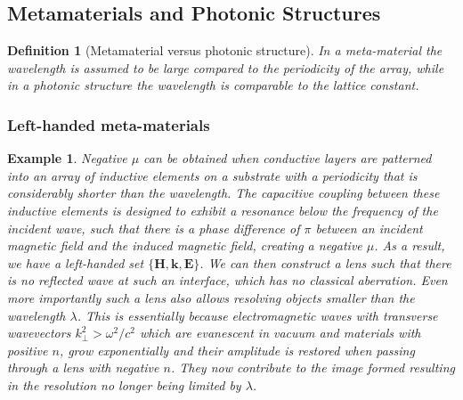 \documentclass[a4paper]{article}
\newtheorem{eg}{Example}[section]
\theoremstyle{new}
\newtheorem{defi}{Definition}[section]
\begin{document}
\subsection{Metamaterials and Photonic Structures}
\begin{defi}[Metamaterial versus photonic structure]
In a meta-material the wavelength is assumed to be large compared to the periodicity of the array, while in a photonic structure the wavelength is comparable to the lattice constant.
\end{defi}
\subsubsection*{Left-handed meta-materials}
\begin{eg}
Negative $\mu$ can be obtained when conductive layers are patterned into an array of inductive elements on a substrate with a periodicity that is considerably shorter than the wavelength. The capacitive coupling between these inductive elements is designed to exhibit a resonance below the frequency of the incident wave, such that there is a phase difference of $\pi$ between an incident magnetic field and the induced magnetic field, creating a negative $\mu$. As a result, we have a left-handed set $\{\mathbf{H},\mathbf{k},\mathbf{E}\}$. We can then construct a lens such that there is no reflected wave at such an interface, which has no classical aberration. Even more importantly such a lens also allows resolving objects smaller than the wavelength $\lambda$. This is essentially because electromagnetic waves with transverse wavevectors $k_\perp^2>\omega^2/c^2$ which are evanescent in vacuum and materials with positive $n$, grow exponentially and their amplitude is restored when passing through a lens with negative $n$. They now contribute to the image formed resulting in the resolution no longer being limited by $\lambda$.
\end{eg}
\end{document}
